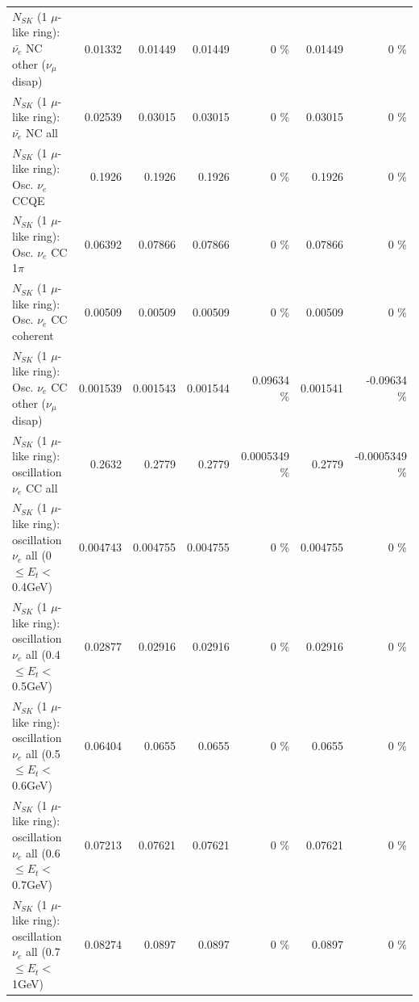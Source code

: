 \begin{table}
\begin{tabular}{| l | r | r | r  r | r  r |}
          $N_{SK}$ (1 $\mu$-like ring): $\bar{\nu_e}$ NC other ($\nu_\mu$ disap) &         0.01332 &         0.01449 &         0.01449 &        0 \%  &         0.01449 &        0 \%  \\ 
                            $N_{SK}$ (1 $\mu$-like ring): $\bar{\nu_{e}}$ NC all &         0.02539 &         0.03015 &         0.03015 &        0 \%  &         0.03015 &        0 \%  \\ 
\hline
\hline
\hline
                                 $N_{SK}$ (1 $\mu$-like ring): Osc. $\nu_e$ CCQE &          0.1926 &          0.1926 &          0.1926 &        0 \%  &          0.1926 &        0 \%  \\ 
                            $N_{SK}$ (1 $\mu$-like ring): Osc. $\nu_e$ CC 1$\pi$ &         0.06392 &         0.07866 &         0.07866 &        0 \%  &         0.07866 &        0 \%  \\ 
                          $N_{SK}$ (1 $\mu$-like ring): Osc. $\nu_e$ CC coherent &         0.00509 &         0.00509 &         0.00509 &        0 \%  &         0.00509 &        0 \%  \\ 
           $N_{SK}$ (1 $\mu$-like ring): Osc. $\nu_e$ CC other ($\nu_\mu$ disap) &        0.001539 &        0.001543 &        0.001544 &  0.09634 \%  &        0.001541 & -0.09634 \%  \\ 
                        $N_{SK}$ (1 $\mu$-like ring): oscillation $\nu_e$ CC all &          0.2632 &          0.2779 &          0.2779 & 0.0005349 \%  &          0.2779 & -0.0005349 \%  \\ 
\hline
$N_{SK}$ (1 $\mu$-like ring): oscillation $\nu_{e}$ all (0 $\leq E_{t} <$ 0.4GeV) &        0.004743 &        0.004755 &        0.004755 &        0 \%  &        0.004755 &        0 \%  \\ 
$N_{SK}$ (1 $\mu$-like ring): oscillation $\nu_{e}$ all (0.4 $\leq E_{t} <$ 0.5GeV) &         0.02877 &         0.02916 &         0.02916 &        0 \%  &         0.02916 &        0 \%  \\ 
$N_{SK}$ (1 $\mu$-like ring): oscillation $\nu_{e}$ all (0.5 $\leq E_{t} <$ 0.6GeV) &         0.06404 &          0.0655 &          0.0655 &        0 \%  &          0.0655 &        0 \%  \\ 
$N_{SK}$ (1 $\mu$-like ring): oscillation $\nu_{e}$ all (0.6 $\leq E_{t} <$ 0.7GeV) &         0.07213 &         0.07621 &         0.07621 &        0 \%  &         0.07621 &        0 \%  \\ 
$N_{SK}$ (1 $\mu$-like ring): oscillation $\nu_{e}$ all (0.7 $\leq E_{t} <$ 1GeV) &         0.08274 &          0.0897 &          0.0897 &        0 \%  &          0.0897 &        0 \%  \\ 

\end{tabular}
\end{table}
